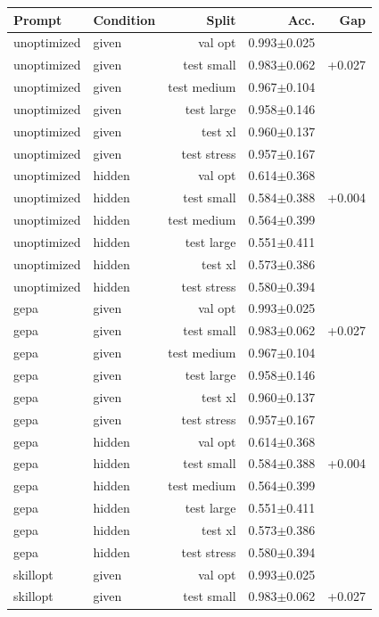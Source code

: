 \begin{tabular}{llrrr}
\toprule
Prompt & Condition & Split & Acc. & Gap \\
\midrule
unoptimized & given & val opt & 0.993$\pm$0.025 &  \\
unoptimized & given & test small & 0.983$\pm$0.062 & +0.027 \\
unoptimized & given & test medium & 0.967$\pm$0.104 &  \\
unoptimized & given & test large & 0.958$\pm$0.146 &  \\
unoptimized & given & test xl & 0.960$\pm$0.137 &  \\
unoptimized & given & test stress & 0.957$\pm$0.167 &  \\
unoptimized & hidden & val opt & 0.614$\pm$0.368 &  \\
unoptimized & hidden & test small & 0.584$\pm$0.388 & +0.004 \\
unoptimized & hidden & test medium & 0.564$\pm$0.399 &  \\
unoptimized & hidden & test large & 0.551$\pm$0.411 &  \\
unoptimized & hidden & test xl & 0.573$\pm$0.386 &  \\
unoptimized & hidden & test stress & 0.580$\pm$0.394 &  \\
gepa & given & val opt & 0.993$\pm$0.025 &  \\
gepa & given & test small & 0.983$\pm$0.062 & +0.027 \\
gepa & given & test medium & 0.967$\pm$0.104 &  \\
gepa & given & test large & 0.958$\pm$0.146 &  \\
gepa & given & test xl & 0.960$\pm$0.137 &  \\
gepa & given & test stress & 0.957$\pm$0.167 &  \\
gepa & hidden & val opt & 0.614$\pm$0.368 &  \\
gepa & hidden & test small & 0.584$\pm$0.388 & +0.004 \\
gepa & hidden & test medium & 0.564$\pm$0.399 &  \\
gepa & hidden & test large & 0.551$\pm$0.411 &  \\
gepa & hidden & test xl & 0.573$\pm$0.386 &  \\
gepa & hidden & test stress & 0.580$\pm$0.394 &  \\
skillopt & given & val opt & 0.993$\pm$0.025 &  \\
skillopt & given & test small & 0.983$\pm$0.062 & +0.027 \\

\end{tabular}
